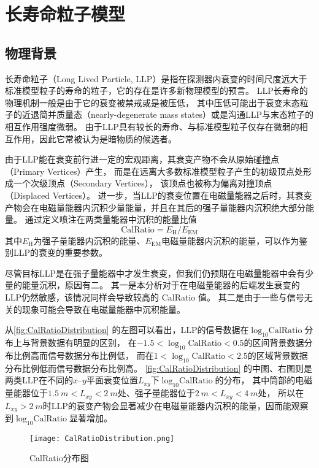 
\chapter{长寿命粒子模型}

\section{物理背景}
长寿命粒子（Long Lived Particle, LLP）是指在探测器内衰变的时间尺度远大于标准模型粒子的寿命的粒子，它的存在是许多新物理模型的预言。
LLP长寿命的物理机制一般是由于它的衰变被禁戒或是被压低，
其中压低可能出于衰变末态粒子的近退简并质量态（nearly-degenerate mass states）或是沟通LLP与末态粒子的相互作用强度微弱。
由于LLP具有较长的寿命、与标准模型粒子仅存在微弱的相互作用，因此它常被认为是暗物质的候选者。

由于LLP能在衰变前行进一定的宏观距离，其衰变产物不会从原始碰撞点（Primary Vertices）产生，
而是在远离大多数标准模型粒子产生的初级顶点处形成一个次级顶点（Secondary Vertices），
该顶点也被称为偏离对撞顶点（Displaced Vertices）。
进一步，当LLP的衰变位置在电磁量能器之后时，其衰变产物会在电磁量能器内沉积少量能量，并且在其后的强子量能器内沉积绝大部分能量。
通过定义喷注在两类量能器中沉积的能量比值$$\text{CalRatio}=E_{\text{H}}/E_{\text{EM}}$$
其中$E_{\text{H}}$为强子量能器内沉积的能量、$E_{\text{EM}}$电磁量能器内沉积的能量，可以作为鉴别LLP的衰变的重要参数。
\cite{calratio}

尽管目标LLP是在强子量能器中才发生衰变，但我们仍预期在电磁量能器中会有少量的能量沉积，原因有二。
其一是本分析对于在电磁量能器的后端发生衰变的LLP仍然敏感，该情况同样会导致较高的 CalRatio 值。
其二是由于一些与信号无关的现象可能会导致在电磁量能器中沉积能量。

从\autoref{fig:CalRatioDistribution} 的左图可以看出，LLP的信号数据在$\log_{10}\text{CalRatio}$分布上与背景数据有明显的区别，
在$-1.5<\log_{10}\text{CalRatio}<0.5$的区间背景数据分布比例高而信号数据分布比例低，
而在$1<\log_{10}\text{CalRatio}<2.5$的区域背景数据分布比例低而信号数据分布比例高。
\autoref{fig:CalRatioDistribution} 的中图、右图则是两类LLP在不同的$x$--$y$平面衰变位置$L_{xy}$下$\log_{10}\text{CalRatio}$的分布，
其中筒部的电磁量能器位于$\SI{1.5}{m} < L_{xy} < \SI{2}{m}$处、强子量能器位于$\SI{2}{m} < L_{xy} < \SI{4}{m}$处，
所以在$L_{xy} > \SI{2}{m}$时LLP的衰变产物会显著减少在电磁量能器内沉积的能量，因而能观察到$\log_{10}\text{CalRatio}$显著增加。

\begin{figure}[ht]
    \centering
    \texttt{[image: CalRatioDistribution.png]}
    \caption{CalRatio分布图}
    \label{fig:CalRatioDistribution}
\end{figure}

